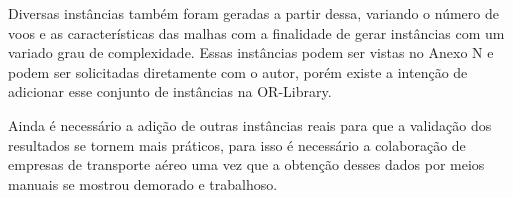 	Diversas instâncias também foram geradas a partir dessa, variando o número de voos e as características das malhas  com a finalidade de gerar instâncias com um variado grau de complexidade. Essas instâncias podem ser vistas no Anexo N e podem ser solicitadas diretamente com o autor, porém existe a intenção de adicionar esse conjunto de instâncias na OR-Library.
  
	Ainda é necessário a adição de outras instâncias reais para que a validação dos resultados se tornem mais práticos, para isso é necessário a colaboração de empresas de transporte aéreo uma vez que a obtenção desses dados por meios manuais se mostrou demorado e trabalhoso. 
  